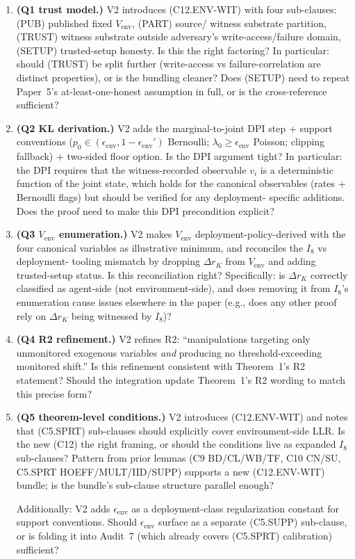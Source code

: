 \documentclass{article}
\newcommand{\Vem}{V_{\mathrm{env}}}
\newcommand{\eenv}{\epsilon_{\mathrm{env}}}
\begin{document}
\begin{enumerate}
\item \textbf{(Q1 trust model.)}  V2 introduces (C12.ENV-WIT) with
  four sub-clauses: (PUB) published fixed $\Vem$, (PART) source/
  witness substrate partition, (TRUST) witness substrate outside
  adversary's write-access/failure domain, (SETUP) trusted-setup
  honesty.  Is this the right factoring?  In particular: should
  (TRUST) be split further (write-access vs failure-correlation
  are distinct properties), or is the bundling cleaner?  Does
  (SETUP) need to repeat Paper~5's at-least-one-honest assumption
  in full, or is the cross-reference sufficient?

\item \textbf{(Q2 KL derivation.)}  V2 adds the marginal-to-joint
  DPI step + support conventions ($p_0 \in (\eenv, 1-\eenv')$
  Bernoulli; $\lambda_0 \geq \eenv$ Poisson; clipping fallback) +
  two-sided floor option.  Is the DPI argument tight?  In
  particular: the DPI requires that the witness-recorded
  observable $v_i$ is a deterministic function of the joint
  state, which holds for the canonical observables (rates +
  Bernoulli flags) but should be verified for any deployment-
  specific additions.  Does the proof need to make this DPI
  precondition explicit?

\item \textbf{(Q3 $\Vem$ enumeration.)}  V2 makes $\Vem$
  deployment-policy-derived with the four canonical variables as
  illustrative minimum, and reconciles the $I_8$ vs deployment-
  tooling mismatch by dropping $\Delta r_K$ from $\Vem$ and adding
  trusted-setup status.  Is this reconciliation right?  Specifically:
  is $\Delta r_K$ correctly classified as agent-side (not
  environment-side), and does removing it from $I_8$'s enumeration
  cause issues elsewhere in the paper (e.g., does any other proof
  rely on $\Delta r_K$ being witnessed by $I_8$)?

\item \textbf{(Q4 R2 refinement.)}  V2 refines R2: ``manipulations
  targeting only unmonitored exogenous variables \emph{and}
  producing no threshold-exceeding monitored shift.''  Is this
  refinement consistent with Theorem~1's R2 statement?  Should
  the integration update Theorem~1's R2 wording to match this
  precise form?

\item \textbf{(Q5 theorem-level conditions.)}  V2 introduces
  (C12.ENV-WIT) and notes that (C5.SPRT) sub-clauses should
  explicitly cover environment-side LLR.  Is the new (C12) the
  right framing, or should the conditions live as expanded $I_8$
  sub-clauses?  Pattern from prior lemmas (C9 BD/CL/WB/TF, C10
  CN/SU, C5.SPRT HOEFF/MULT/IID/SUPP) supports a new
  (C12.ENV-WIT) bundle; is the bundle's sub-clause structure
  parallel enough?

  Additionally: V2 adds $\eenv$ as a deployment-class regularization
  constant for support conventions.  Should $\eenv$ surface as a
  separate (C5.SUPP) sub-clause, or is folding it into Audit~7
  (which already covers (C5.SPRT) calibration) sufficient?
\end{enumerate}
\end{document}
